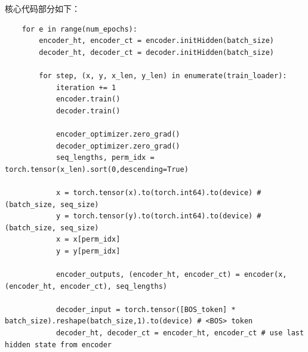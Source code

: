 \documentclass[logo,reportComp]{thesis}
\begin{document}
核心代码部分如下：
\begin{lstlisting}
    for e in range(num_epochs):
        encoder_ht, encoder_ct = encoder.initHidden(batch_size)
        decoder_ht, decoder_ct = decoder.initHidden(batch_size)

        for step, (x, y, x_len, y_len) in enumerate(train_loader):
            iteration += 1
            encoder.train()
            decoder.train()

            encoder_optimizer.zero_grad()
            decoder_optimizer.zero_grad()
            seq_lengths, perm_idx = torch.tensor(x_len).sort(0,descending=True)

            x = torch.tensor(x).to(torch.int64).to(device) # (batch_size, seq_size)
            y = torch.tensor(y).to(torch.int64).to(device) # (batch_size, seq_size)
            x = x[perm_idx]
            y = y[perm_idx]

            encoder_outputs, (encoder_ht, encoder_ct) = encoder(x, (encoder_ht, encoder_ct), seq_lengths)

            decoder_input = torch.tensor([BOS_token] * batch_size).reshape(batch_size,1).to(device) # <BOS> token
            decoder_ht, decoder_ct = encoder_ht, encoder_ct # use last hidden state from encoder


\end{lstlisting}
\end{document}
